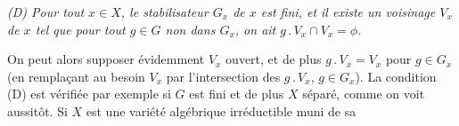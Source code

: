 \textit{\textup{(D)} Pour tout $x\in X$, le stabilisateur $G_x$ de $x$ est
fini, et il existe un voisinage $V_x$ de $x$ tel que pour tout $g\in G$ non
dans $G_x$, on ait $g\mathbin{.}V_x\cap V_x=\phi$.}

On peut alors supposer évidemment $V_x$ ouvert, et de plus
$g\mathbin{.}V_x=V_x$ pour $g\in G_x$ (en remplaçant au besoin $V_x$ par
l'intersection des $g\mathbin{.}V_x$, $g\in G_x$). La condition (D) est vérifiée
par exemple si $G$ est fini et de plus $X$ séparé, comme on voit aussitôt. Si
$X$ est une variété algébrique irréductible muni de sa

\endgroup
{}
